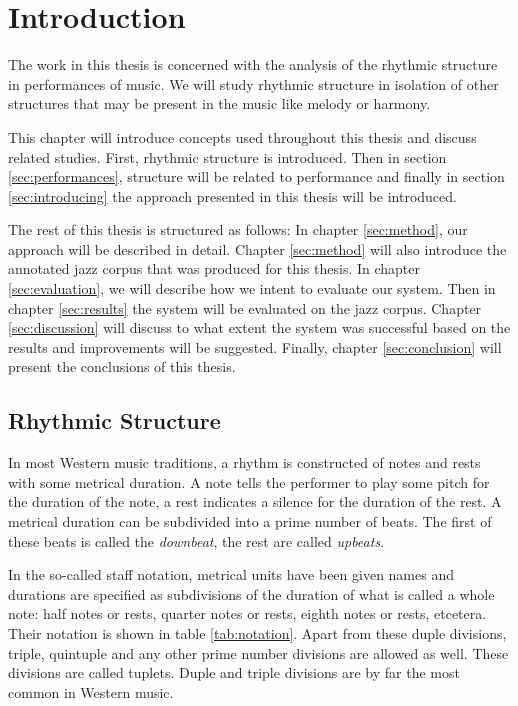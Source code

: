 \chapter{Introduction}
\label{sec:introduction}

The work in this thesis is concerned with the analysis of the rhythmic structure in performances of music. We will study rhythmic structure in isolation of other structures that may be present in the music like melody or harmony.

This chapter will introduce concepts used throughout this thesis and discuss related studies. First, rhythmic structure is introduced. Then in section \ref{sec:performances}, structure will be related to performance and finally in section \ref{sec:introducing} the approach presented in this thesis will be introduced.

The rest of this thesis is structured as follows: In chapter \ref{sec:method}, our approach will be described in detail. Chapter \ref{sec:method} will also introduce the annotated jazz corpus that was produced for this thesis. In chapter \ref{sec:evaluation}, we will describe how we intent to evaluate our system. Then in chapter \ref{sec:results} the system will be evaluated on the jazz corpus. Chapter \ref{sec:discussion} will discuss to what extent the system was successful based on the results and improvements will be suggested. Finally, chapter \ref{sec:conclusion} will present the conclusions of this thesis.

\section{Rhythmic Structure}
\label{sec:structure}

In most Western music traditions, a rhythm is constructed of notes and rests with some metrical duration. A note tells the performer to play some pitch for the duration of the note, a rest indicates a silence for the duration of the rest. A metrical duration can be subdivided into a prime number of beats. The first of these beats is called the \textit{downbeat}, the rest are called \textit{upbeats}.

In the so-called staff notation, metrical units have been given names and durations are specified as subdivisions of the duration of what is called a whole note: half notes or rests, quarter notes or rests, eighth notes or rests, etcetera. Their notation is shown in table \ref{tab:notation}. Apart from these duple divisions, triple, quintuple and any other prime number divisions are allowed as well. These divisions are called tuplets. Duple and triple divisions are by far the most common in Western music.

